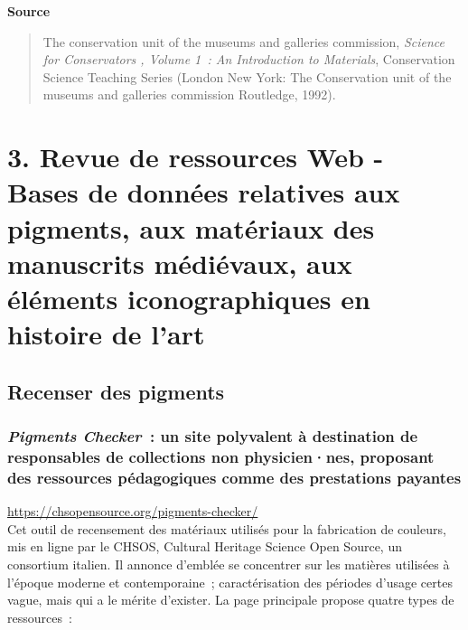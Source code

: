 \documentclass[a4paper,12pt, twoside]{book}
\begin{document}
\bigskip

\large \textbf{\textcolor{teal2}{Source}}\\

\begin{quote}
    \small The conservation unit of the museums and galleries commission, \textit{Science for Conservators ,  Volume 1~:  An Introduction to Materials}, Conservation Science Teaching Series (London New York: The Conservation unit of the museums and galleries commission Routledge, 1992).
\end{quote}

\clearemptydoublepage
\chapter*{3. Revue de ressources Web - Bases de données relatives aux pigments, aux matériaux des manuscrits médiévaux, aux éléments iconographiques en histoire de l’art}

\section*{Recenser des pigments}

\subsection*{\textit{Pigments Checker}~: un site polyvalent à destination de responsables de collections non physicien·nes, proposant des ressources pédagogiques comme des prestations payantes}

 \url{https://chsopensource.org/pigments-checker/}\\

 \normalsize Cet outil de recensement des matériaux utilisés pour la fabrication de couleurs, mis en ligne par le CHSOS, Cultural Heritage Science Open Source, un consortium italien. Il annonce d’emblée se concentrer sur les matières utilisées à l’époque moderne et contemporaine~; caractérisation des périodes d’usage certes vague, mais qui a le mérite d’exister. La page principale propose quatre types de ressources~:
\end{document}
